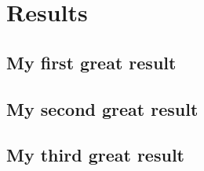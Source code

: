\chapter{Results}
\label{p1:results}

\section{My first great result}

\section{My second great result}

\section{My third great result}

